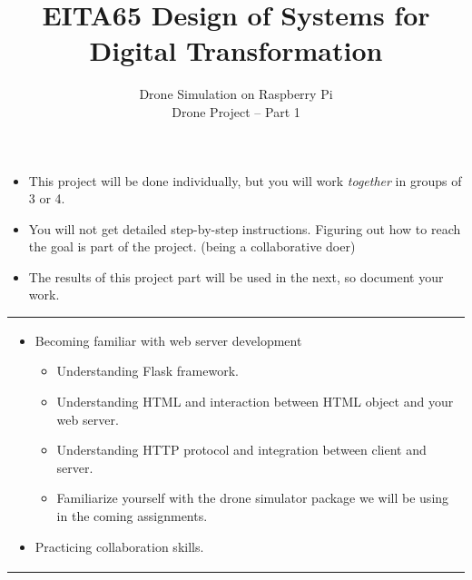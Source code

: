 \documentclass{article}
\title{EITA65 Design of Systems for Digital Transformation\\\year}
\author{\huge Drone Simulation on Raspberry Pi\\Drone Project -- Part 1}
\begin{document}
\clearpage\maketitle
\thispagestyle{empty}%

\begin{itemize}
\item This project will be done individually, but you will work \textit{together} in groups of 3 or 4.
\item You will not get detailed step-by-step instructions. Figuring out how to reach the goal is part of the project. (being a collaborative doer)
\item The results of this project part will be used in the next, so document your work.
\end{itemize}

\vspace{.1cm}
\begin{center}
\begin{tabular}{l}
\toprule[1.5pt]
\parbox{0.8\linewidth}{
\vspace{.2cm}{\Large Learning goals:}
\begin{itemize}
\item Becoming familiar with web server development
  \begin{itemize}
  \item Understanding Flask framework.
  \item Understanding HTML and interaction between HTML object and your web server. 
  \item Understanding HTTP protocol and integration between client and server. 
  \item Familiarize yourself with the drone simulator package we will be using in the coming assignments.
  \end{itemize}
\item Practicing collaboration skills.
\end{itemize}}\\
\bottomrule[1.5pt]
\end{tabular}
\end{center}
\vfill
\end{document}
